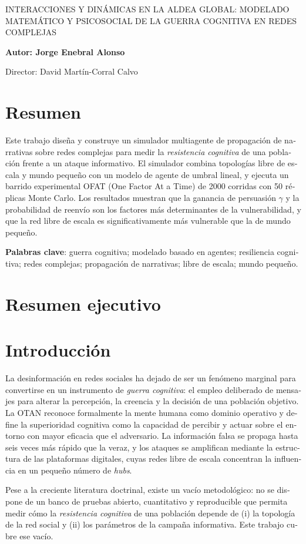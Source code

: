 \documentclass[12pt]{extarticle}
\numberwithin{equation}{section}
\newcommand{\projectTitle}{Interacciones y Dinámicas en la Aldea Global: Modelado Matemático y Psicosocial de la Guerra Cognitiva en Redes Complejas}
\newcommand{\Author}{Jorge Enebral Alonso}
\newcommand{\Director}{David Martín-Corral Calvo}
\newcommand{\sectionnotoc}[1]{%
    \refstepcounter{section}%
    \section*{\thesection\quad #1}%
}
\begin{document}
\begin{otherlanguage}{spanish}

{\large \MakeUppercase{\projectTitle}}
\vspace{3mm}

\textbf{Autor: \Author}

Director: \Director

\section*{Resumen}

Este trabajo diseña y construye un simulador multiagente de propagación de narrativas sobre redes complejas para medir la \emph{resistencia cognitiva} de una población frente a un ataque informativo. El simulador combina topologías libre de escala y mundo pequeño con un modelo de agente de umbral lineal, y ejecuta un barrido experimental OFAT (One Factor At a Time) de 2000 corridas con 50 réplicas Monte Carlo. Los resultados muestran que la ganancia de persuasión $\gamma$ y la probabilidad de reenvío son los factores más determinantes de la vulnerabilidad, y que la red libre de escala es significativamente más vulnerable que la de mundo pequeño.

\textbf{Palabras clave}: guerra cognitiva; modelado basado en agentes; resiliencia cognitiva; redes complejas; propagación de narrativas; libre de escala; mundo pequeño.

\section*{Resumen ejecutivo}

\sectionnotoc{Introducci\'on}

La desinformación en redes sociales ha dejado de ser un fenómeno marginal para convertirse en un instrumento de \emph{guerra cognitiva}: el empleo deliberado de mensajes para alterar la percepción, la creencia y la decisión de una población objetivo. La OTAN reconoce formalmente la mente humana como dominio operativo y define la superioridad cognitiva como la capacidad de percibir y actuar sobre el entorno con mayor eficacia que el adversario. La información falsa se propaga hasta seis veces más rápido que la veraz, y los ataques se amplifican mediante la estructura de las plataformas digitales, cuyas redes libre de escala concentran la influencia en un pequeño número de \emph{hubs}.

Pese a la creciente literatura doctrinal, existe un vacío metodológico: no se dispone de un banco de pruebas abierto, cuantitativo y reproducible que permita medir cómo la \emph{resistencia cognitiva} de una población depende de (i) la topología de la red social y (ii) los parámetros de la campaña informativa. Este trabajo cubre ese vacío.


\end{otherlanguage}
\end{document}

